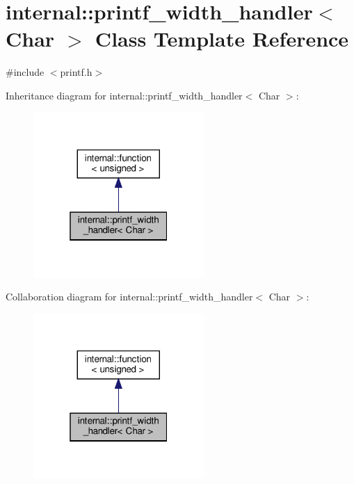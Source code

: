 \hypertarget{classinternal_1_1printf__width__handler}{}\section{internal\+:\+:printf\+\_\+width\+\_\+handler$<$ Char $>$ Class Template Reference}
\label{classinternal_1_1printf__width__handler}


{\ttfamily \#include $<$printf.\+h$>$}



Inheritance diagram for internal\+:\+:printf\+\_\+width\+\_\+handler$<$ Char $>$\+:
\nopagebreak
\begin{figure}[H]
\begin{center}
\leavevmode
\includegraphics[width=184pt]{classinternal_1_1printf__width__handler__inherit__graph}
\end{center}
\end{figure}


Collaboration diagram for internal\+:\+:printf\+\_\+width\+\_\+handler$<$ Char $>$\+:
\nopagebreak
\begin{figure}[H]
\begin{center}
\leavevmode
\includegraphics[width=184pt]{classinternal_1_1printf__width__handler__coll__graph}
\end{center}
\end{figure}
